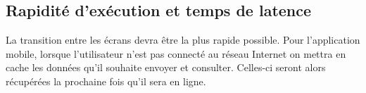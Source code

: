 \subsection{Rapidité d'exécution et temps de latence}
La transition entre les écrans devra être la plus rapide possible. Pour l'application mobile, lorsque l'utilisateur n'est pas connecté au réseau Internet on mettra en cache les données qu'il souhaite envoyer et consulter. Celles-ci seront alors récupérées la prochaine fois qu'il sera en ligne.
